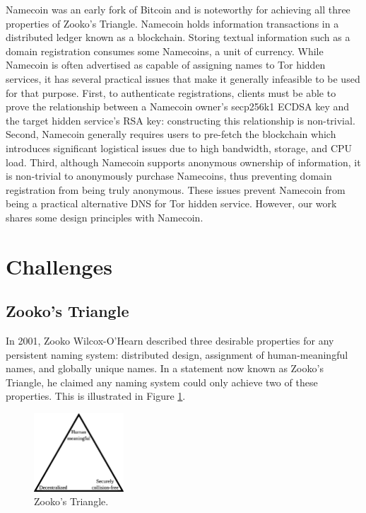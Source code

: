 \documentclass{sig-alternate}
\begin{document}
Namecoin\cite{NamecoinHome}\cite{jacobs2014providing} was an early fork of Bitcoin\cite{nakamoto2008bitcoin} and is noteworthy for achieving all three properties of Zooko's Triangle. Namecoin holds information transactions in a distributed ledger known as a blockchain. Storing textual information such as a domain registration consumes some Namecoins, a unit of currency. While Namecoin is often advertised as capable of assigning names to Tor hidden services, it has several practical issues that make it generally infeasible to be used for that purpose. First, to authenticate registrations, clients must be able to prove the relationship between a Namecoin owner's secp256k1 ECDSA key and the target hidden service's RSA key: constructing this relationship is non-trivial. Second, Namecoin generally requires users to pre-fetch the blockchain which introduces significant logistical issues due to high bandwidth, storage, and CPU load. Third, although Namecoin supports anonymous ownership of information, it is non-trivial to anonymously purchase Namecoins, thus preventing domain registration from being truly anonymous. These issues prevent Namecoin from being a practical alternative DNS for Tor hidden service. However, our work shares some design principles with Namecoin.

\section{Challenges}

\subsection{Zooko's Triangle} %

In 2001, Zooko Wilcox-O'Hearn described three desirable properties for any persistent naming system: distributed design, assignment of human-meaningful names, and globally unique names. In a statement now known as Zooko's Triangle,\cite{ferdous2009security}\cite{stiegler2005petname} he claimed any naming system could only achieve two of these properties. This is illustrated in Figure \ref{fig:ZookosTriangle}.

\begin{figure}[htbp]
	\centering
	\includegraphics[width=0.3\textwidth]{../images/Zooko.eps}
	\caption{Zooko's Triangle.}
	\label{fig:ZookosTriangle}
\end{figure}
\end{document}
